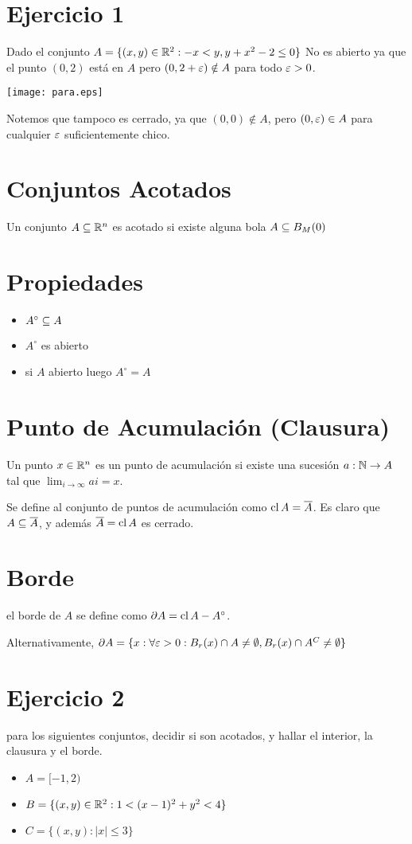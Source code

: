 \documentclass{article}
\begin{document}
\section{Ejercicio 1}
Dado el conjunto $A = \{(x, y) \in \mathbb{R}^2 : -x < y, y + x^2 - 2 \leq 0\}$
No es abierto ya que el punto $(0, 2)$ está en $A$ pero $(0, 2 + \varepsilon) \notin A$
para todo $\varepsilon > 0$.

\texttt{[image: para.eps]}

Notemos que tampoco es cerrado, ya que $(0, 0) \notin A$, pero $(0, \varepsilon) \in A$ para
cualquier $\varepsilon$ suficientemente chico.

\section{Conjuntos Acotados}
Un conjunto $A \subseteq \mathbb{R}^n$ es acotado si existe alguna bola $A \subseteq B_M(0)$

\section{Propiedades}
\begin{itemize}
	\item $A^\circ \subseteq A$
	\item $A^\circ$ es abierto
	\item si $A$ abierto luego $A^\circ = A$
\end{itemize}

\section{Punto de Acumulación (Clausura)}
Un punto $x \in \mathbb{R}^n$ es un punto de acumulación
si existe una sucesión $a : \mathbb{N} \to A$ tal que $\lim_{i \to \infty} ai = x$.

Se define al conjunto de puntos de acumulación como $\operatorname{cl} A = \overline A$.
Es claro que $A \subseteq \overline A$, y además $\overline A = \operatorname{cl} A$ es cerrado.

\section{Borde}
el borde de $A$ se define como $\partial A = \operatorname{cl} A - A^\circ$.

Alternativamente, $\partial A = \{ x : \forall \varepsilon > 0 : B_r(x) \cap A \neq \emptyset,
B_r(x) \cap A^C \neq \emptyset
\}$

\section{Ejercicio 2}
para los siguientes conjuntos, decidir si son acotados, y hallar el interior,
la clausura y el borde.
\begin{itemize}
	\item $A = [-1, 2)$
	\item $B = \{(x, y) \in \mathbb{R}^2 : 1 < (x-1)^2 + y^2 < 4\}$
	\item $C = \{(x, y) : |x| \leq 3\}$
\end{itemize}
\end{document}
